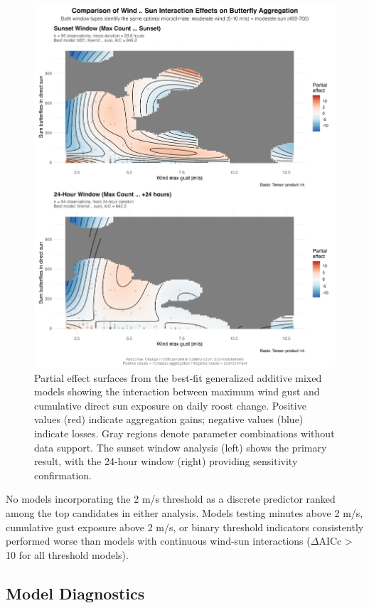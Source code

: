 \begin{figure}[htbp]
\centering
\includegraphics[width=\textwidth]{figures/results/window_comparison_interaction.png}
\caption{Partial effect surfaces from the best-fit generalized additive mixed models showing the interaction between maximum wind gust and cumulative direct sun exposure on daily roost change. Positive values (red) indicate aggregation gains; negative values (blue) indicate losses. Gray regions denote parameter combinations without data support. The sunset window analysis (left) shows the primary result, with the 24-hour window (right) providing sensitivity confirmation.}
\label{fig:dynamic_interaction}
\end{figure}

No models incorporating the 2 m/s threshold as a discrete predictor ranked among the top candidates in either analysis. Models testing minutes above 2 m/s, cumulative gust exposure above 2 m/s, or binary threshold indicators consistently performed worse than models with continuous wind-sun interactions ($\Delta$AICc > 10 for all threshold models).

\subsection{Model Diagnostics}

